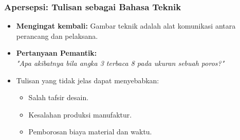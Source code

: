 \documentclass[../gbr_teknik.tex]{subfiles}
\begin{document}


\begin{frame}[mytitle=standard]
	\frametitle{Apersepsi: Tulisan sebagai Bahasa Teknik}

	\begin{itemize}
		\item \textbf{Mengingat kembali:} Gambar teknik adalah alat komunikasi antara perancang dan pelaksana.
		\item \textbf{Pertanyaan Pemantik:} \\
		      \textit{"Apa akibatnya bila angka 3 terbaca 8 pada ukuran sebuah poros?"}
		\item Tulisan yang tidak jelas dapat menyebabkan:
		      \begin{itemize}
			      \item Salah tafsir desain.
			      \item Kesalahan produksi manufaktur.
			      \item Pemborosan biaya material dan waktu.
		      \end{itemize}
	\end{itemize}

\end{frame}

\end{document}
